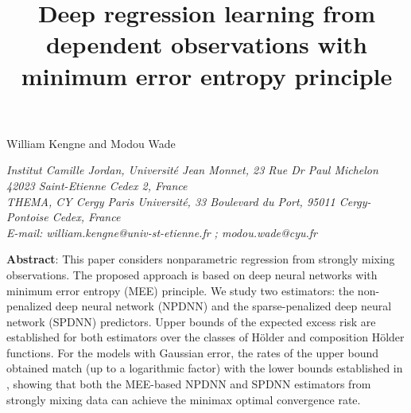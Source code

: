 \documentclass[10pt,twoside]{article}
\numberwithin{equation}{section}
\begin{document}

\title{\bf Deep regression learning from dependent observations with minimum error entropy principle}
 \maketitle \vspace{-1.0cm}
 
\begin{center}
      William Kengne
   and 
     Modou Wade
 \end{center}

  \begin{center}
  { \it 
  Institut Camille Jordan, Université Jean Monnet, 23 Rue Dr Paul Michelon 42023 Saint-Etienne Cedex 2, France\\  
 THEMA, CY Cergy Paris Université, 33 Boulevard du Port, 95011 Cergy-Pontoise Cedex, France\\
  E-mail:   william.kengne@univ-st-etienne.fr  ; modou.wade@cyu.fr\\
  }
\end{center}
 \pagestyle{myheadings}



\medskip


\textbf{Abstract}:
%
This paper considers nonparametric regression from strongly mixing observations.
The proposed approach is based on deep neural networks with minimum error entropy (MEE) principle. 
%
We study two estimators: the non-penalized deep neural network (NPDNN) and the sparse-penalized deep neural network (SPDNN) predictors.
%
Upper bounds of the expected excess risk are established for both estimators over the classes of H\"older and composition H\"older functions.
% 
%
For the models with Gaussian error, the rates of the upper bound obtained match (up to a logarithmic factor) with the lower bounds established in \cite{schmidt2020nonparametric}, showing that both the MEE-based NPDNN and SPDNN estimators from strongly mixing data can achieve the minimax optimal convergence rate. 
%

 
\medskip
 
\end{document}
